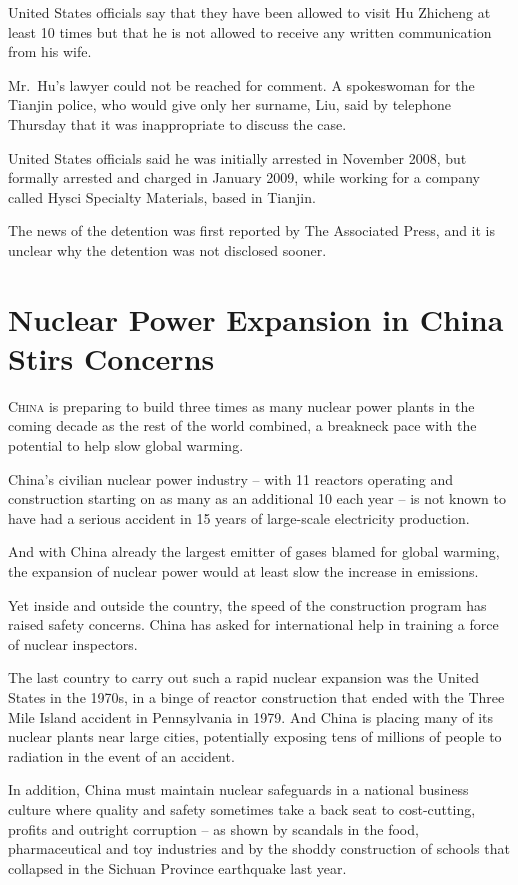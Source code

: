 ﻿\documentclass[12pt]{article}
\begin{document}
United States officials say that they have been allowed to visit Hu Zhicheng at least 10 times but
that he is not allowed to receive any written communication from his wife.

Mr.~Hu's lawyer could not be reached for comment. A spokeswoman for the Tianjin police, who would
give only her surname, Liu, said by telephone Thursday that it was inappropriate to discuss the
case.

United States officials said he was initially arrested in November 2008, but formally arrested and
charged in January 2009, while working for a company called Hysci Specialty Materials, based in
Tianjin.

The news of the detention was first reported by The Associated Press, and it is unclear why the
detention was not disclosed sooner.

\section{Nuclear Power Expansion in China Stirs Concerns}

\lettrine{C}{hina} is preparing to build three times as many nuclear power
plants in the coming decade as the rest of the world combined, a breakneck pace with the potential
to help slow global warming.

China's civilian nuclear power industry -- with 11 reactors operating and construction starting on
as many as an additional 10 each year -- is not known to have had a serious accident in 15 years of
large-scale electricity production.

And with China already the largest emitter of gases blamed for global warming, the expansion of
nuclear power would at least slow the increase in emissions.

Yet inside and outside the country, the speed of the construction program has raised safety
concerns. China has asked for international help in training a force of nuclear inspectors.

The last country to carry out such a rapid nuclear expansion was the United States in the 1970s, in
a binge of reactor construction that ended with the Three Mile Island accident in Pennsylvania in
1979. And China is placing many of its nuclear plants near large cities, potentially exposing tens
of millions of people to radiation in the event of an accident.

In addition, China must maintain nuclear safeguards in a national business culture where quality and
safety sometimes take a back seat to cost-cutting, profits and outright corruption -- as shown by
scandals in the food, pharmaceutical and toy industries and by the shoddy construction of schools
that collapsed in the Sichuan Province earthquake last year.
\end{document}
